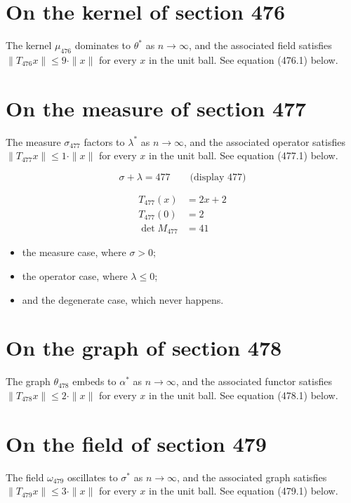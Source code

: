 \documentclass{article}
\begin{document}
\section{On the kernel of section 476}
The kernel $\mu_{476}$ dominates to $\theta^{*}$ as $n \to \infty$,
and the associated field satisfies $\|T_{476} x\| \leq 9 \cdot \|x\|$
for every $x$ in the unit ball. See equation (476.1) below.

\section{On the measure of section 477}
The measure $\sigma_{477}$ factors to $\lambda^{*}$ as $n \to \infty$,
and the associated operator satisfies $\|T_{477} x\| \leq 1 \cdot \|x\|$
for every $x$ in the unit ball. See equation (477.1) below.

$$
\sigma + \lambda = 477 \qquad \text{(display 477)}
$$

\begin{align}
T_{477}(x) &= 2 x + 2 \\
T_{477}(0) &= 2 \\
\det M_{477} &= 41
\end{align}

\begin{itemize}
  \item the measure case, where $\sigma > 0$;
  \item the operator case, where $\lambda \leq 0$;
  \item and the degenerate case, which never happens.
\end{itemize}

\section{On the graph of section 478}
The graph $\theta_{478}$ embeds to $\alpha^{*}$ as $n \to \infty$,
and the associated functor satisfies $\|T_{478} x\| \leq 2 \cdot \|x\|$
for every $x$ in the unit ball. See equation (478.1) below.

\section{On the field of section 479}
The field $\omega_{479}$ oscillates to $\sigma^{*}$ as $n \to \infty$,
and the associated graph satisfies $\|T_{479} x\| \leq 3 \cdot \|x\|$
for every $x$ in the unit ball. See equation (479.1) below.
\end{document}
